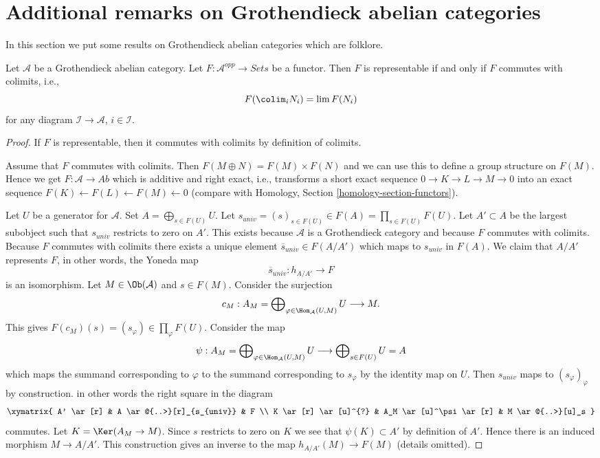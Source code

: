 \section{Additional remarks on Grothendieck abelian categories}
\label{section-additional-Grothendieck}

\noindent
In this section we put some results on Grothendieck abelian categories
which are folklore.

\begin{lemma}
\label{lemma-grothendieck-brown}
Let $\mathcal{A}$ be a Grothendieck abelian category.
Let $F : \mathcal{A}^{opp} \to \textit{Sets}$ be a functor.
Then $F$ is representable if and only if $F$ commutes with colimits, i.e.,
$$
F(\colim_i N_i) = \lim F(N_i)
$$
for any diagram $\mathcal{I} \to \mathcal{A}$, $i \in \mathcal{I}$.
\end{lemma}

\begin{proof}
If $F$ is representable, then it commutes with colimits by definition
of colimits.

\medskip\noindent
Assume that $F$ commutes with colimits. Then $F(M \oplus N) = F(M) \times F(N)$
and we can use this to define a group structure on $F(M)$. Hence we get
$F : \mathcal{A} \to \textit{Ab}$ which is additive and right exact, i.e.,
transforms a short exact sequence $0 \to K \to L \to M \to 0$ into an exact
sequence $F(K) \leftarrow F(L) \leftarrow F(M) \leftarrow 0$ (compare with
Homology, Section \ref{homology-section-functors}).

\medskip\noindent
Let $U$ be a generator for $\mathcal{A}$. Set $A = \bigoplus_{s \in F(U)} U$.
Let $s_{univ} = (s)_{s \in F(U)} \in F(A) = \prod_{s \in F(U)} F(U)$. Let
$A' \subset A$ be the largest subobject such that $s_{univ}$ restricts to
zero on $A'$. This exists because $\mathcal{A}$ is a Grothendieck category
and because $F$ commutes with colimits. Because $F$ commutes with colimits
there exists a unique element $\overline{s}_{univ} \in F(A/A')$ which
maps to $s_{univ}$ in $F(A)$. We claim that $A/A'$ represents $F$, in
other words, the Yoneda map
$$
\overline{s}_{univ} : h_{A/A'} \longrightarrow F
$$
is an isomorphism. Let $M \in \Ob(\mathcal{A})$ and $s \in F(M)$. Consider
the surjection
$$
c_M :
A_M = \bigoplus\nolimits_{\varphi \in \Hom_\mathcal{A}(U, M)} U
\longrightarrow
M.
$$
This gives $F(c_M)(s) = (s_\varphi) \in \prod_\varphi F(U)$.
Consider the map
$$
\psi :
A_M = \bigoplus\nolimits_{\varphi \in \Hom_\mathcal{A}(U, M)} U
\longrightarrow
\bigoplus\nolimits_{s \in F(U)} U = A
$$
which maps the summand corresponding to $\varphi$ to the summand
corresponding to $s_\varphi$ by the identity map on $U$. Then $s_{univ}$
maps to $(s_\varphi)_\varphi$ by construction.
in other words the right square in the diagram
$$
\xymatrix{
A' \ar[r] &
A \ar@{..>}[r]_{s_{univ}} & F \\
K \ar[r] \ar[u]^{?} & A_M \ar[u]^\psi \ar[r] &
M \ar@{..>}[u]_s
}
$$
commutes. Let $K = \Ker(A_M \to M)$. Since $s$ restricts to zero
on $K$ we see that $\psi(K) \subset A'$ by definition of $A'$. Hence there
is an induced morphism $M \to A/A'$. This construction gives an inverse
to the map $h_{A/A'}(M) \to F(M)$ (details omitted).
\end{proof}

